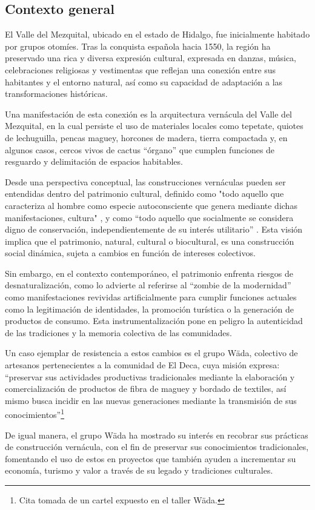 \subsection{Contexto general}

El Valle del Mezquital, ubicado en el estado de Hidalgo, fue inicialmente habitado por grupos otomíes. Tras la conquista española hacia 1550, la región ha preservado una rica y diversa expresión cultural, expresada en danzas, música, celebraciones religiosas y vestimentas que reflejan una conexión entre sus habitantes y el entorno natural, así como su capacidad de adaptación a las transformaciones históricas.

Una manifestación de esta conexión es la arquitectura vernácula del Valle del Mezquital, en la cual persiste el uso de materiales locales como tepetate, quiotes de lechuguilla, pencas maguey, horcones de madera, tierra compactada y, en algunos casos, cercos vivos de cactus ``órgano'' que cumplen funciones de resguardo y delimitación de espacios habitables.

Desde una perspectiva conceptual, las construcciones vernáculas pueden ser entendidas dentro del patrimonio cultural, definido como "todo aquello que caracteriza al hombre como especie autoconsciente que genera mediante dichas manifestaciones, cultura" \citep{dominguez2004pautas}, y como ``todo aquello que socialmente se considera digno de conservación, independientemente de su interés utilitario'' \citep[p. 63]{prats1998concepto}. Esta visión implica que el patrimonio, natural, cultural o biocultural, es una construcción social dinámica, sujeta a cambios en función de intereses colectivos.

Sin embargo, en el contexto contemporáneo, el patrimonio enfrenta riesgos de desnaturalización, como lo advierte \cite{i2008zombi} al referirse al ``zombie de la modernidad'' como manifestaciones revividas artificialmente para cumplir funciones actuales como la legitimación de identidades, la promoción turística o la generación de productos de consumo. Esta instrumentalización pone en peligro la autenticidad de las tradiciones y la memoria colectiva de las comunidades.

Un caso ejemplar de resistencia a estos cambios es el grupo Wäda, colectivo de artesanos pertenecientes a la comunidad de El Deca, cuya misión expresa: ``preservar sus actividades productivas tradicionales mediante la elaboración y comercialización de productos de fibra de maguey y bordado de textiles, así mismo busca incidir en las nuevas generaciones mediante la transmisión de sus conocimientos''\footnote{Cita tomada de un cartel expuesto en el taller Wäda.}

De igual manera, el grupo Wäda ha mostrado su interés en recobrar sus prácticas de construcción vernácula, con el fin de preservar sus conocimientos tradicionales, fomentando el uso de estos en proyectos que también ayuden a incrementar su economía, turismo y valor a través de su legado y tradiciones culturales.
